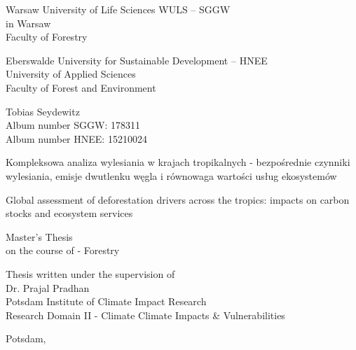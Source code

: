 \begin{titlepage}
	\begin{singlespace}
		\begin{center}
			\Large{Warsaw University of Life Sciences WULS – SGGW}\\
			\Large{in Warsaw}\\
			\Large{Faculty of Forestry}

			\smallskip

			\Large{Eberswalde University for Sustainable Development – HNEE}\\
			\Large{University of Applied Sciences}\\
			\Large{Faculty of Forest and Environment}

			\bigskip

			\large{Tobias Seydewitz}\\
			\normalsize{Album number SGGW: 178311}\\
			\normalsize{Album number HNEE: 15210024}

			\vspace{2cm}
 
			 \huge{Kompleksowa analiza wylesiania w krajach tropikalnych - bezpośrednie czynniki wylesiania, emisje dwutlenku węgla i równowaga wartości usług ekosystemów}

			 \Large{Global assessment of deforestation drivers across the tropics: impacts on carbon stocks and ecosystem services}

			\bigskip

			\large{Master's Thesis}\\
			\large{on the course of - Forestry}

			\vspace{2cm}

			\begin{flushright}
				\normalsize{Thesis written under the supervision of}\\
				\normalsize{Dr. Prajal Pradhan}\\
				\normalsize{Potsdam Institute of Climate Impact Research}\\
				\normalsize{Research Domain II - Climate Climate Impacts \& Vulnerabilities}
			\end{flushright}

			\bigskip

			\normalsize{Potsdam, \the\year}
		\end{center}
	\end{singlespace}
\end{titlepage}